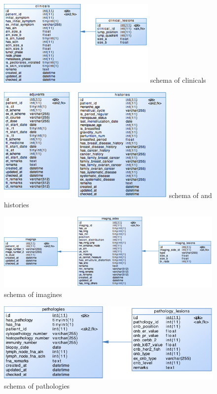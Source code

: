 \begin{figure}[!htp]
  \centering
  \includegraphics{figure/chap3-5_clinicals.png}
    {schema of clinicals}
  \label{fig:ch3-5}
\end{figure}


\begin{figure}[!htp]
  \centering
  \includegraphics{figure/chap3-4_histories.png}
    {schema of  and histories }
  \label{fig:ch3-4}
\end{figure}


\begin{figure}[!htp]
  \centering
  \includegraphics{figure/chap3-3_imagines.png}
    {schema of imagines}
  \label{fig:ch3-3}
\end{figure}


\begin{figure}[!htp]
  \centering
  \includegraphics{figure/chap3-2_pathologies.png}
    {schema of pathologies}
  \label{fig:ch3-2}
\end{figure}

